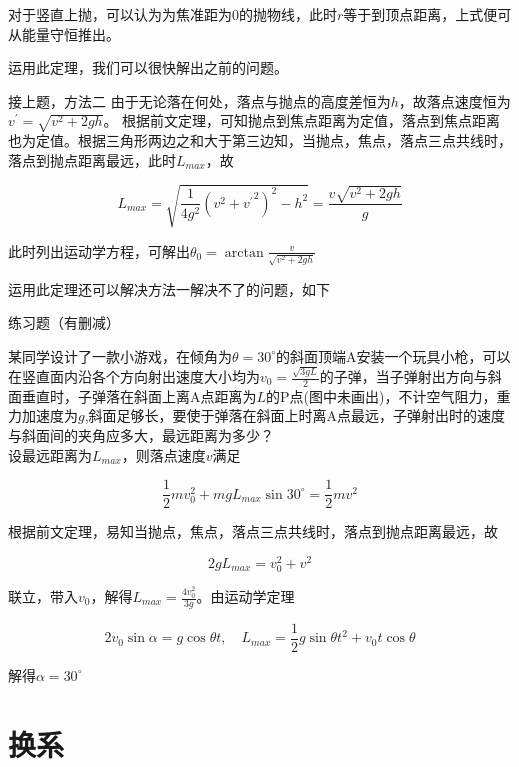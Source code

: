 对于竖直上抛，可以认为为焦准距为$0$的抛物线，此时$r$等于到顶点距离，上式便可从能量守恒推出。

运用此定理，我们可以很快解出之前的问题。

\begin{ep}{接上题，方法二}{}
由于无论落在何处，落点与抛点的高度差恒为$h$，故落点速度恒为$v^{\prime} = \sqrt{v^2 + 2gh}$。
根据前文定理，可知抛点到焦点距离为定值，落点到焦点距离也为定值。根据三角形两边之和大于第三边知，当抛点，焦点，落点三点共线时，落点到抛点距离最远，此时$L_{max}$，故

$$L_{max} = \sqrt{\frac{1}{4g^2} (v^2 + {v^{\prime}}^2)^2 - h^2} = \frac{v\sqrt{v^2 + 2gh}}{g}$$

此时列出运动学方程，可解出$\theta_0 = \arctan{\frac{v}{\sqrt{v^2 + 2gh}}}$
\end{ep}

运用此定理还可以解决方法一解决不了的问题，如下

\begin{ep}{练习题（有删减）}{}



某同学设计了一款小游戏，在倾角为$\theta = 30^{\circ}$的斜面顶端A安装一个玩具小枪，可以在竖直面内沿各个方向射出速度大小均为$v_0 = \frac{\sqrt{3gL}}{2}$的子弹，当子弹射出方向与斜面垂直时，子弹落在斜面上离A点距离为$L$的P点(图中未画出)，不计空气阻力，重力加速度为$g$,斜面足够长，要使于弹落在斜面上时离A点最远，子弹射出时的速度与斜面间的夹角应多大，最远距离为多少？
~\\

设最远距离为$L_{max}$，则落点速度$v$满足

$$\frac{1}{2} m v_0^2 + mgL_{max} \sin 30^{\circ} = \frac{1}{2} m v^2$$

根据前文定理，易知当抛点，焦点，落点三点共线时，落点到抛点距离最远，故

$$2gL_{max} = v_0^2 + v^2$$

联立，带入$v_0$，解得$L_{max} = \frac{4 v_0^2}{3g}$。由运动学定理

$$2 v_0 \sin \alpha = g \cos \theta t ,\quad L_{max} = \frac{1}{2} g \sin \theta t^2 + v_0 t \cos \theta$$

解得$\alpha = 30^{\circ}$

\end{ep}

\section{换系}

